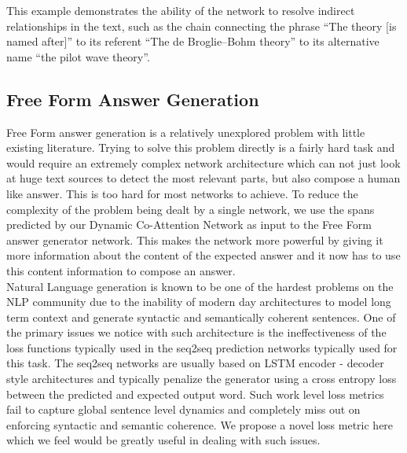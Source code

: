 This example demonstrates the ability of the network to resolve indirect relationships in the text, such as the chain connecting the phrase ``The theory [is named after]'' to its referent ``The de Broglie–Bohm theory'' to its alternative name ``the pilot wave theory''.

\subsection{Free Form Answer Generation}

Free Form answer generation is a relatively unexplored problem with little existing literature. Trying to solve this problem directly is a fairly hard task and would require an extremely complex network architecture which can not just look at huge text sources to detect the most relevant parts, but also compose a human like answer. This is too hard for most networks to achieve. To reduce the complexity of the problem being dealt by a single network, we use the spans predicted by our Dynamic Co-Attention Network as input to the Free Form answer generator network. This makes the network more powerful by giving it more information about the content of the expected answer and it now has to use this content information to compose an answer. \\

Natural Language generation is known to be one of the hardest problems on the NLP community due to the inability of modern day architectures to model long term context and generate syntactic and semantically coherent sentences. One of the primary issues we notice with such architecture is the ineffectiveness of the loss functions typically used in the seq2seq prediction networks typically used for this task. The seq2seq networks are usually based on LSTM encoder - decoder style architectures and typically penalize the generator using a cross entropy loss between the predicted and expected output word. Such work level loss metrics fail to capture global sentence level dynamics and completely miss out on enforcing syntactic and semantic coherence. We propose a novel loss metric here which we feel would be greatly useful in dealing with such issues.\\

